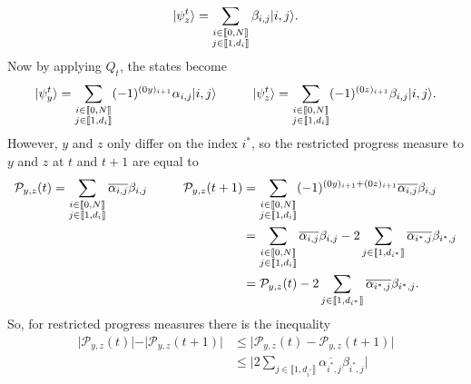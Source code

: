 \begin{appendix}
\begin{tproof}
\[            |\psi^{t}_z\rangle = \sum_{\substack{i \in \llbracket0,N\rrbracket\\j \in \llbracket1, d_i\rrbracket}}\beta_{i,j} |i,j\rangle.\]
        Now by applying $Q_t$, the states become
        \[|\psi^{t}_y\rangle = \sum_{\substack{i \in \llbracket0,N\rrbracket\\j \in \llbracket1, d_i\rrbracket}} (-1)^{(0y)_{i+1}}\alpha_{i,j} |i,j\rangle \hspace*{1cm }
            |\psi^{t}_z\rangle = \sum_{\substack{i \in \llbracket0,N\rrbracket\\j \in \llbracket1, d_i\rrbracket}}(-1)^{(0z)_{i+1}}\beta_{i,j} |i,j\rangle.\]
        However, $y$ and $z$ only differ on the index $i^*$, so the restricted progress measure
        to $y$ and $z$ at $t$ and $t+1$ are equal to
        \begin{align*}
            \mathcal{P}_{y,z}(t) = \sum_{\substack{i \in \llbracket0,N\rrbracket                        \\j \in \llbracket1, d_i\rrbracket}} \overline{\alpha_{i,j}}\beta_{i,j} \hspace*{1cm}
            \mathcal{P}_{y,z}(t+1) & = \sum_{\substack{i \in \llbracket0,N\rrbracket                    \\j \in \llbracket1, d_i\rrbracket}} (-1)^{(0y)_{i+1}+(0z)_{i+1}} \overline{\alpha_{i,j}}\beta_{i,j} \\
                                   & = \sum_{\substack{i \in \llbracket0,N\rrbracket                    \\j \in \llbracket1, d_i\rrbracket}} \overline{\alpha_{i,j}}\beta_{i,j} -
            2\sum_{j\in\llbracket1,d_{i^*}\rrbracket} \overline{\alpha_{i^*,j}}\beta_{i^*,j}            \\
                                   & = \mathcal{P}_{y,z}(t) - 2\sum_{j\in\llbracket1,d_{i^*}\rrbracket}
            \overline{\alpha_{i^*,j}}\beta_{i^*,j}       .                                              \\
        \end{align*}
        So, for restricted progress measures there is the inequality
        \begin{align*}
            \vert \mathcal{P}_{y,z}(t)\vert - \vert \mathcal{P}_{y,z}(t+1)\vert & \leq \vert \mathcal{P}_{y,z}(t) - \mathcal{P}_{y,z}(t+1)\vert                                      \\
                                                                                & \leq \vert 2\sum_{j\in\llbracket1,d_{i^*}\rrbracket} \overline{\alpha_{i^*,j}}\beta_{i^*,j}  \vert \\

\end{align*}
\end{tproof}
\end{appendix}
